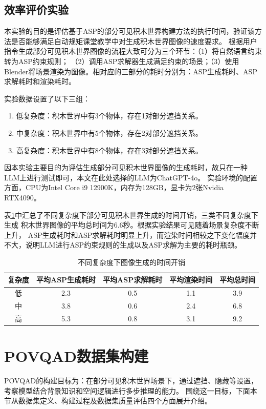 \subsection{效率评价实验}
本实验的目的是评估基于ASP的部分可见积木世界构建方法的执行时间，验证该方法是否能够满足自动规矩课堂教学中对生成积木世界图像的速度要求。
根据用户指令生成部分可见积木世界图像的流程大致可分为三个环节：（1）将自然语言约束转为ASP约束规则；
（2）调用ASP求解器生成满足约束的场景；（3）使用Blender将场景渲染为图像。相对应的三部分的耗时分别为：ASP生成耗时、ASP求解耗时和渲染耗时。

实验数据设置了以下三组：
\begin{enumerate}[nosep]
\item 低复杂度：积木世界中有3个物体，存在1对部分遮挡关系。
\item 中复杂度：积木世界中有5个物体，存在2对部分遮挡关系。
\item 高复杂度：积木世界中有8个物体，存在3对部分遮挡关系。
\end{enumerate}

因本实验主要目的为评估生成部分可见积木世界图像的生成耗时，故只在一种LLM上进行测试即可，本文在此处选择的LLM为ChatGPT-4o。
实验环境的配置方面，CPU为Intel Core i9 12900K，内存为128GB，显卡为2张Nvidia RTX4090。

表\ref{tab:time-for-asp-based-image-generation}中汇总了不同复杂度下部分可见积木世界生成的时间开销，三类不同复杂度下生成
积木世界图像的平均总时间为6.6秒。根据实验结果可见随着场景复杂度不断上升，
ASP生成耗时和ASP求解耗时明显上升，而渲染时间相较之下变化幅度并不大，说明LLM进行ASP约束规则的生成以及ASP求解为主要的耗时瓶颈。
\begin{table}[h]
  \centering
  \begin{tabular}{ccccc}
    \toprule
    \textbf{复杂度} & \textbf{平均ASP生成耗时} & \textbf{平均ASP求解耗时} & \textbf{平均渲染时间} & \textbf{平均总时间} \\ 
    \midrule
    低 & 2.3 & 0.5 & 1.1 & 3.9 \\ 
    \midrule
    中 & 3.8 & 0.6 & 2.4 & 6.8 \\
    \midrule
    高 & 5.3 & 0.8 & 3.1 & 9.2 \\
    \bottomrule
  \end{tabular}
  \caption{不同复杂度下图像生成的时间开销}
  \label{tab:time-for-asp-based-image-generation}
\end{table}
\section{POVQAD数据集构建}
POVQAD的构建目标为：在部分可见积木世界场景下，通过遮挡、隐藏等设置，考察模型结合背景知识和空间逻辑进行多步推理的能力。
围绕这一目标，下面本节从数据集定义、构建过程及数据集质量评估四个方面展开介绍。

